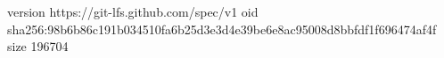 version https://git-lfs.github.com/spec/v1
oid sha256:98b6b86c191b034510fa6b25d3e3d4e39be6e8ac95008d8bbfdf1f696474af4f
size 196704
